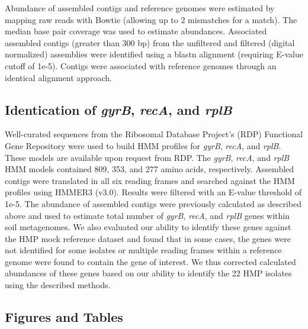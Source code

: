 \documentclass[11pt]{article} %
\begin{document}
Abundance of assembled contigs and reference genomes were estimated by mapping raw reads with Bowtie (allowing up to 2 mismatches for a match).  The median base pair coverage was used to estimate abundances.  Associated assembled contigs (greater than 300 bp) from the unfiltered and filtered (digital normalized) assemblies were identified using a blastn alignment (requiring E-value cutoff of 1e-5).  Contigs were associated with reference genomes through an identical alignment approach.

\subsection{Identication of \emph{gyrB}, \emph{recA}, and \emph{rplB}}
Well-curated sequences from the Ribosomal Database Project's (RDP) Functional Gene Repository were used to build HMM profiles for \emph{gyrB}, \emph{recA}, and \emph{rplB}.  These models are available upon request from RDP.  The \emph{gyrB}, \emph{recA}, and \emph{rplB} HMM models contained 809, 353, and 277 amino acids, respectively.  Assembled contigs were translated in all six reading frames and searched against the HMM profiles using HMMER3 (v3.0).  Results were filtered with an E-value threshold of 1e-5.  The abundance of assembled contigs were previously calculated as described above and used to estimate total number of \emph{gyrB}, \emph{recA}, and \emph{rplB} genes within soil metagenomes.  We also evaluated our ability to identify these genes against the HMP mock reference dataset and found that in some cases, the genes were not identified for some isolates or multiple reading frames within a reference genome were found to contain the gene of interest.  We thus corrected calculated abundances of these genes based on our ability to identify the 22 HMP isolates using the described methods.  

\subsection{Figures and Tables}
\end{document}
